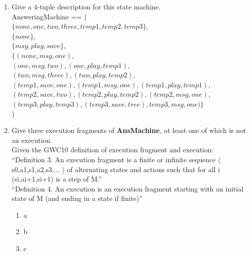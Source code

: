\documentclass{article}
\begin{document}
\begin{enumerate}
\begin{enumerate}
 \item Give a 4-tuple description for this state machine. \\
   AnsweringMachine == ( \\
   $\{none,one,two,three,temp1,temp2,temp3 \}$, \\
   $\{none \}$, \\
   $\{msg, play, save \}$, \\
   $\{(none, msg, one),$ \\
   $ (one, msg, two), (one, play, temp1),$ \\
   $ (two, msg, three),(two, play, temp2),$ \\
   $ (temp1, save, one), (temp1, msg, one), (temp1, play, temp1), $ \\
   $ (temp2, save, two), (temp2, play, temp2), (temp2, msg, one),$ \\
   $ (temp3, play, temp3), (temp3, save, tree), temp3, msg, one) \}$ \\
   ) \\
 \item Give three execution fragments of {\bf AnsMachine}, at least one of which is not an
   execution. \\
   Given the GWC10 definition of execution fragment and execution: \\
   ``Definition 3. An execution fragment is a finite or infinite sequence $\langle$ s0,a1,s1,a2,s3,... $\rangle$ of alternating states and actions such that for all i (si,ai+1,si+1) is a step of M.''\\
   ``Definition 4. An execution is an execution fragment starting with an initial state of M (and ending in a state if finite)'' \\
   \begin{enumerate}
   \item a
   \item b
   \item c
   \end{enumerate}
 

\end{enumerate}
\end{enumerate}
\end{document}
